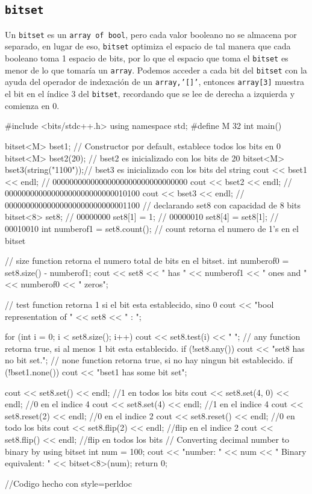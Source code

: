 \documentclass[a4paper,11pt]{article}
\begin{document}
\subsection*{\texttt{bitset}}
Un \texttt{bitset} es un \texttt{array of bool}, pero cada valor booleano no se almacena por separado, en lugar de eso, \texttt{bitset} optimiza el espacio de tal manera que cada booleano toma 1 espacio de bits, por lo que el espacio que toma el \texttt{bitset} es menor de lo que tomaría un \texttt{array}. Podemos acceder a cada bit del \texttt{bitset} con la ayuda del operador de indexación de un \texttt{array,'[]'}, entonces \texttt{array[3]} muestra el bit en el índice 3 del \texttt{bitset}, recordando que se lee de derecha a izquierda y comienza en 0.
\begin{pyglist}[language=c++,caption={bitset},listingname={\textbf{Ejemplo}},style=perldoc]
#include <bits/stdc++.h> 
using namespace std; 
#define M 32 
int main() { 
    bitset<M> bset1;     // Constructor por default, establece todos los bits en 0 
    bitset<M> bset2(20); // bset2 es inicializado con los bits de 20 
    bitset<M> bset3(string("1100"));// bset3 es inicializado con los bits del string 
    cout << bset1 << endl; // 00000000000000000000000000000000 
    cout << bset2 << endl; // 00000000000000000000000000010100 
    cout << bset3 << endl; // 00000000000000000000000000001100 
    // declarando set8 con capacidad de 8 bits 
    bitset<8> set8; // 00000000 
    set8[1] = 1; // 00000010 
    set8[4] = set8[1]; // 00010010  
    int numberof1 = set8.count(); // count retorna el numero de 1's en el bitset 

    // size function retorna el numero total de bits en el bitset. 
    int numberof0 = set8.size() - numberof1; 
    cout << set8 << " has " << numberof1 << " ones and "
         << numberof0 << " zeros\n"; 

    // test function retorna 1 si el bit esta establecido, sino 0 
    cout << "bool representation of " << set8 << " : "; 
    
    for (int i = 0; i < set8.size(); i++) cout << set8.test(i) << " "; 
    // any function retorna true, si al menos 1 bit esta establecido.
    if (!set8.any()) cout << "set8 has no bit set.\n"; 
    // none function retorna true, si no hay ningun bit establecido. 
    if (!bset1.none()) cout << "bset1 has some bit set\n"; 
    
    cout << set8.set() << endl; //1 en todos los bits
    cout << set8.set(4, 0) << endl; //0 en el indice 4
    cout << set8.set(4) << endl; //1 en el indice 4
    cout << set8.reset(2) << endl; //0 en el indice 2 
    cout << set8.reset() << endl;  //0 en todo los bits
    cout << set8.flip(2) << endl; //flip en el indice 2
    cout << set8.flip() << endl; //flip en todos los bits
    // Converting decimal number to binary by using bitset 
    int num = 100; 
    cout << "\nDecimal number: " << num 
         << "  Binary equivalent: " << bitset<8>(num);
    return 0; 
} 
//Codigo hecho con style=perldoc
\end{pyglist}
\end{document}
